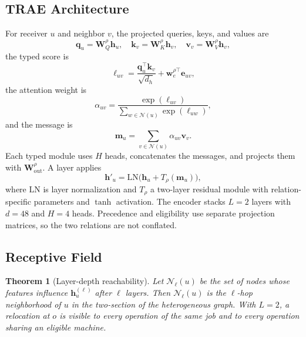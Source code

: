 \documentclass[conference]{IEEEtran}
\newtheorem{theorem}{Theorem}
\theoremstyle{remark}
\newcommand{\cN}{\mathcal{N}}
\begin{document}
\subsection{TRAE Architecture}
\label{sec:S-attention}

For receiver $u$ and neighbor $v$, the projected queries, keys, and values are
\begin{equation}
\bm{q}_u=\bm{W}_Q^{\rho}\bm{h}_u,\quad
\bm{k}_v=\bm{W}_K^{\rho}\bm{h}_v,\quad
\bm{v}_v=\bm{W}_V^{\rho}\bm{h}_v,
\label{eq:S-qkv}
\end{equation}
the typed score is
\begin{equation}
\ell_{uv}=\frac{\bm{q}_u^{\top}\bm{k}_v}{\sqrt{d_h}}+\bm{w}_e^{\rho\top}\bm{e}_{uv},
\label{eq:S-score}
\end{equation}
the attention weight is
\begin{equation}
\alpha_{uv}=\frac{\exp(\ell_{uv})}{\sum_{w\in\cN(u)}\exp(\ell_{uw})},
\label{eq:S-att}
\end{equation}
and the message is
\begin{equation}
\bm{m}_u=\sum_{v\in\cN(u)}\alpha_{uv}\bm{v}_v.
\label{eq:S-message}
\end{equation}
Each typed module uses $H$ heads, concatenates the messages, and projects them with $\bm{W}_{\mathrm{out}}^{\rho}$. A layer applies
\begin{equation}
\bm{h}'_u=\mathrm{LN}\big(\bm{h}_u+T_{\rho}(\bm{m}_u)\big),
\label{eq:S-layer}
\end{equation}
where $\mathrm{LN}$ is layer normalization and $T_{\rho}$ a two-layer residual module with relation-specific parameters and $\tanh$ activation. The encoder stacks $L=2$ layers with $d=48$ and $H=4$ heads. Precedence and eligibility use separate projection matrices, so the two relations are not conflated.

\subsection{Receptive Field}
\label{sec:S-field}

\begin{theorem}[Layer-depth reachability]
\label{thm:S-field}
Let $\cN_\ell(u)$ be the set of nodes whose features influence $\bm{h}_u^{(\ell)}$ after $\ell$ layers. Then $\cN_\ell(u)$ is the $\ell$-hop neighborhood of $u$ in the two-section of the heterogeneous graph. With $L=2$, a relocation at $o$ is visible to every operation of the same job and to every operation sharing an eligible machine.
\end{theorem}
\end{document}
